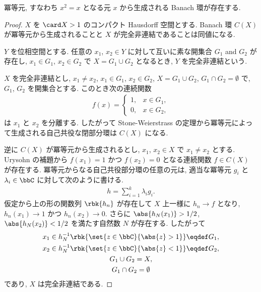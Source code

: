 \documentclass[openany, a4paper, oneside]{jsbook}
\begin{document}
\begin{ex}
冪等元, すなわち $x^2 = x$ となる元 $x$ から生成される Banach 環が存在する.
\end{ex}
\begin{proof}
$X$ を $\card X >1$ のコンパクト Hausdorff 空間とする.
Banach 環 $C(X)$ が冪等元から生成されることと $X$ が完全非連結であることは同値になる.

$Y$ を位相空間とする.
任意の $x_1$, $x_2 \in Y$ に対して互いに素な開集合 $G_1$ and $G_2$ が存在し,
$x_1 \in G_1$, $x_2 \in G_2$ で $X = G_1 \cup G_2$ となるとき,
$Y$ を完全非連結という.

$X$ を完全非連結とし, $x_1 \neq x_2$, $x_1 \in G_1$,
$x_2 \in G_2$, $X = G_1 \cup G_2$, $G_1 \cap G_2 = \emptyset$ で,
$G_1$, $G_2$ を開集合とする.
このとき次の連続関数
\begin{align}
 f(x)
 =
 \begin{cases}
  1, & x \in G_1, \\
  0, & x \in G_2,
 \end{cases}
\end{align}
は $x_1$ と $x_2$ を分離する.
したがって Stone-Weierstrass の定理から冪等元によって生成される自己共役な閉部分環は $C(X)$ になる.

逆に $C(X)$ が冪等元から生成されるとし,
$x_1$, $x_2 \in X$ で $x_1 \neq x_2$ とする.
Urysohn の補題から $f(x_1) = 1$ かつ $f(x_2) = 0$ となる連続関数 $f \in C(X)$ が存在する.
冪等元からなる自己共役部分環の任意の元は, 適当な冪等元 $g_i$ と $\lambda_i \in \bbC$ に対して次のように書ける.
\begin{align}
 h
 =
 \sum_{i=1}^k \lambda_i g_i.
\end{align}
仮定から上の形の関数列 $\rbk{h_n}$ が存在して $X$ 上一様に $h_n \to f$ となり,
$h_n(x_1) \to 1$ かつ $h_n(x_2) \to 0$.
さらに $\abs{h_{N} (x_1)} > 1 / 2$, $\abs{h_N (x_2)} < 1 / 2$ を満たす自然数 $N$ が存在する.
したがって
\begin{gather}
 x_1
 \in
 h_N^{-1} \rbk{\set{z \in \bbC}{\abs{z} > 1}}
 \eqdef
 G_1, \\
 x_2
 \in
 h_N^{-1} \rbk{\set{z \in \bbC}{\abs{z} < 1}}
 \eqdef
 G_2, \\
 G_1 \cup G_2
 =
 X, \\
 G_1 \cap G_2
 =
 \emptyset
\end{gather}
であり, $X$ は完全非連結である.
\end{proof}
\end{document}
